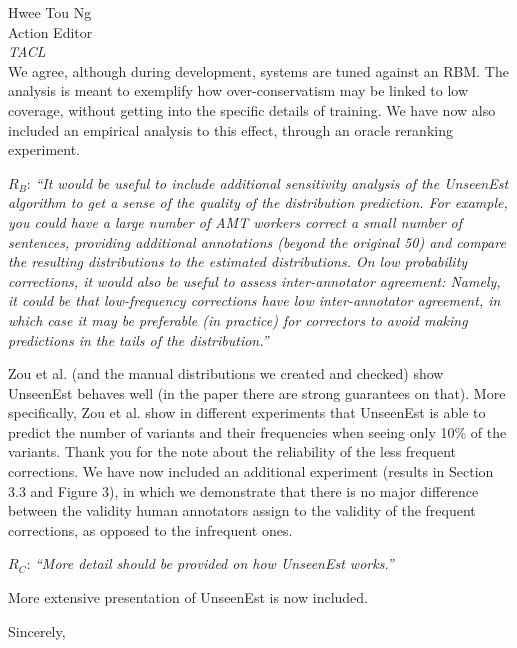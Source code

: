 \documentclass[11pt,letterpaper]{letter}
\newcommand{\oa}[1]{\footnote{\color{red}OA: #1}}
\begin{document}
\begin{letter}{%
Hwee Tou Ng\\
Action Editor\\
{\em TACL}\\
}
We agree, although during development, systems are tuned against an RBM. The analysis is meant to exemplify how over-conservatism may be linked to low coverage, without getting into the specific details of training. We have now also included an empirical analysis to this effect, through an oracle reranking experiment.
	
$R_B$: \emph{``It would be useful to include additional sensitivity analysis of the
		UnseenEst algorithm to get a sense of the quality of the distribution
		prediction. For example, you could have a large number of AMT workers
		correct a small number of sentences, providing additional annotations
		(beyond the original 50) and compare the resulting distributions to the
		estimated distributions. On low probability corrections, it would also be
		useful to assess inter-annotator agreement: Namely, it could be that
		low-frequency corrections have low inter-annotator agreement, in which case
		it may be preferable (in practice) for correctors to avoid making
		predictions in the tails of the distribution.''
		}
		
Zou et al. (and the manual distributions we created and checked) show UnseenEst behaves well (in the paper there are strong guarantees on that). More specifically, Zou et al. show in different experiments that UnseenEst is able to predict the number of variants and their frequencies when seeing only 10\% of the variants. 
Thank you for the note about the reliability of the less frequent corrections. We have now included an additional experiment (results in Section 3.3 and Figure 3), in which we demonstrate that there is no major difference between the validity human annotators assign to the validity of the frequent corrections, as opposed to the infrequent ones.
		
$R_C$: \emph{``More detail should be provided on how UnseenEst works.''}
		
More extensive presentation of UnseenEst is now included. 


\closing{Sincerely,}

\end{letter}
\end{document}
